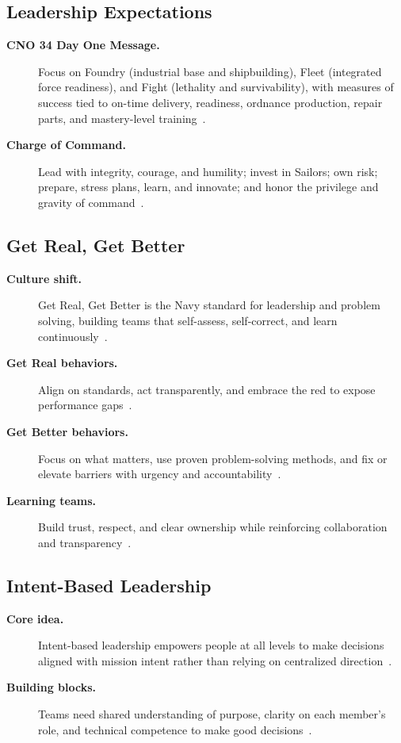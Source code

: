 \documentclass[../main.tex]{subfiles}
\begin{document}
\subsection{Leadership Expectations}
\begin{description}
  \item[\textbf{CNO 34 Day One Message.}] Focus on Foundry (industrial base and shipbuilding), Fleet (integrated force readiness), and Fight (lethality and survivability), with measures of success tied to on-time delivery, readiness, ordnance production, repair parts, and mastery-level training~\autocite{edo-5-1-6-leading-people-2025,cno34-day-one-message-2025}.
  \item[\textbf{Charge of Command.}] Lead with integrity, courage, and humility; invest in Sailors; own risk; prepare, stress plans, learn, and innovate; and honor the privilege and gravity of command~\autocite{edo-5-1-6-leading-people-2025,cno-charge-of-command-2025}.
\end{description}

\subsection{Get Real, Get Better}
\begin{description}
  \item[\textbf{Culture shift.}] Get Real, Get Better is the Navy standard for leadership and problem solving, building teams that self-assess, self-correct, and learn continuously~\autocite{edo-5-1-6-leading-people-2025,Navy-NLDF-GRGB-Leaders-Toolkit-2026}.
  \item[\textbf{Get Real behaviors.}] Align on standards, act transparently, and embrace the red to expose performance gaps~\autocite{edo-5-1-6-leading-people-2025}.
  \item[\textbf{Get Better behaviors.}] Focus on what matters, use proven problem-solving methods, and fix or elevate barriers with urgency and accountability~\autocite{edo-5-1-6-leading-people-2025,Navy-NLDF-GRGB-Leaders-Toolkit-2026}.
  \item[\textbf{Learning teams.}] Build trust, respect, and clear ownership while reinforcing collaboration and transparency~\autocite{edo-5-1-6-leading-people-2025}.
\end{description}

\subsection{Intent-Based Leadership}
\begin{description}
  \item[\textbf{Core idea.}] Intent-based leadership empowers people at all levels to make decisions aligned with mission intent rather than relying on centralized direction~\autocite{edo-5-1-6-leading-people-2025}.
  \item[\textbf{Building blocks.}] Teams need shared understanding of purpose, clarity on each member's role, and technical competence to make good decisions~\autocite{edo-5-1-6-leading-people-2025}.
\end{description}
\end{document}
